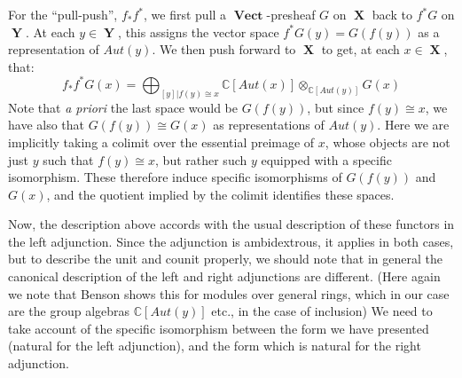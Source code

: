 \documentclass[10pt]{amsart}
\numberwithin{theorem}{subsection}
\newcommand{\opname}[1]{\operatorname{#1}}
\newcommand{\catname}[1]{\boldsymbol{\opname{{#1}}}}
\newcommand{\X}{\catname{X}}
\newcommand{\Y}{\catname{Y}}
\newcommand{\V}{\catname{Vect}}
\begin{document}
For the ``pull-push'', $f_{\ast} f^{\ast}$, we first pull a
$\V$-presheaf $G$ on $\X$ back to $f^{\ast}G$ on $\Y$.  At each $y \in
\Y$, this assigns the vector space $f^{\ast}G(y) = G(f(y))$ as a
representation of $Aut(y)$. We then push forward to $\X$ to get, at
each $x \in \X$, that:
\begin{equation}
f_{\ast} f^{\ast} G (x) = \bigoplus_{[y] | f(y) \cong x} \mathbb{C}[Aut(x)] \otimes_{\mathbb{C}[Aut(y)]} G(x)
\end{equation}
Note that \textit{a priori} the last space would be $G(f(y))$, but
since $f(y) \cong x$, we have also that $G(f(y)) \cong G(x)$ as
representations of $Aut(y)$.  Here we are implicitly taking a colimit
over the essential preimage of $x$, whose objects are not just $y$
such that $f(y) \cong x$, but rather such $y$ equipped with a
specific isomorphism.  These therefore induce specific isomorphisms of
$G(f(y))$ and $G(x)$, and the quotient implied by the colimit
identifies these spaces.

Now, the description above accords with the usual description of these
functors in the left adjunction.  Since the adjunction is
ambidextrous, it applies in both cases, but to describe the unit and
counit properly, we should note that in general the canonical
description of the left and right adjunctions are different.  (Here
again we note that Benson \cite{benson} shows this for modules over
general rings, which in our case are the group algebras
$\mathbb{C}[Aut(y)]$ etc., in the case of inclusion) We need to take
account of the specific isomorphism between the form we have presented
(natural for the left adjunction), and the form which is natural for
the right adjunction.
\end{document}

